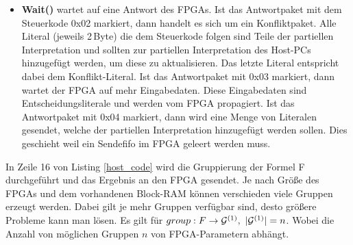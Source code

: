 \begin{itemize}
\item
  \textbf{Wait()} wartet auf eine Antwort des FPGAs. Ist das Antwortpaket mit dem 
  Steuerkode 0x02 markiert, dann handelt es sich um ein Konfliktpaket. 
  Alle Literal (jeweils 2\,Byte) die dem Steuerkode folgen sind Teile der partiellen 
  Interpretation und sollten zur partiellen Interpretation des Host-PCs 
  hinzugefügt werden, um diese zu aktualisieren. Das letzte Literal entspricht dabei dem Konflikt-Literal. 
  Ist das Antwortpaket mit 0x03 markiert, dann wartet der FPGA auf mehr Eingabedaten.
  Diese Eingabedaten sind Entscheidungsliterale und werden vom FPGA propagiert.
  Ist das Antwortpaket mit 0x04 markiert, dann wird eine Menge von Literalen gesendet, 
  welche der partiellen Interpretation hinzugefügt werden sollen. Dies geschieht 
  weil ein Sendefifo im FPGA geleert werden muss.
\end{itemize}
In Zeile 16 von Listing \ref{host_code} wird die Gruppierung der Formel F durchgeführt und
das Ergebnis an den FPGA gesendet. Je nach Größe des FPGAs und dem vorhandenen Block-RAM können verschieden viele Gruppen
erzeugt werden. Dabei gilt je mehr Gruppen verfügbar sind, desto größere Probleme kann man lösen.
Es gilt für $group: F \rightarrow {\cal G}^{(1)},\ |{\cal G}^{(1)}| = n$. Wobei die
Anzahl von möglichen Gruppen $n$ von FPGA-Parametern abhängt.\\

